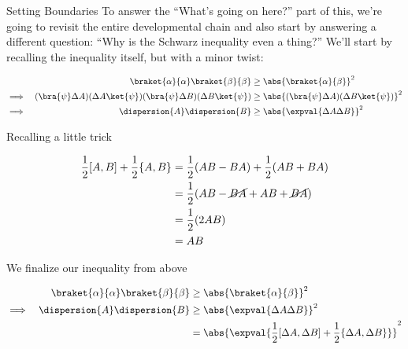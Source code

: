 \begin{answer}
\begin{answerpart}{Setting Boundaries}
    To answer the ``What's going on here?'' part of this, we're going
    to revisit the entire developmental chain and also start by
    answering a different question: ``Why is the Schwarz inequality
    even a thing?''  We'll start by recalling the inequality itself,
    but with a minor twist:

    \begin{equation}
      \begin{alignedat}{2}
        & &
        \braket{\alpha}{\alpha}\braket{\beta}{\beta}
        &\ge \abs{\braket{\alpha}{\beta}}^2\\
        \implies \quad & &
        (\bra{\psi}\Delta A)(\Delta A\ket{\psi})
        (\bra{\psi}\Delta B)(\Delta B\ket{\psi})
        &\ge
        \abs{(\bra{\psi}\Delta A)(\Delta B\ket{\psi})}^2\\
        \implies \quad & &
        \dispersion{A}
        \dispersion{B}
        &\ge
        \abs{\expval{\Delta A \Delta B}}^2
      \end{alignedat}
    \end{equation}

    Recalling a little trick

    \begin{equation}
      \begin{split}
        \frac{1}{2}[A, B] + \frac{1}{2}\{A, B\}
        &= \frac{1}{2}(AB - BA) + \frac{1}{2}(AB + BA)\\
        &= \frac{1}{2}(AB - \cancel{BA} + AB + \cancel{BA})\\
        &= \frac{1}{2}(2 AB)\\
        &= AB\\
      \end{split}
    \end{equation}

    We finalize our inequality from above

    \begin{equation}
      \begin{alignedat}{2}
        & &
        \braket{\alpha}{\alpha}\braket{\beta}{\beta}
        &\ge \abs{\braket{\alpha}{\beta}}^2\\
        \implies \quad & &
        \dispersion{A}
        \dispersion{B}
        &\ge
        \abs{\expval{\Delta A \Delta B}}^2\\
        & &
        &=
        \abs{\expval{\frac{1}{2}[\Delta A, \Delta B]
            + \frac{1}{2}\{\Delta A, \Delta B\}}}^2\\
      \end{alignedat}
    \end{equation}


\end{answerpart}
\end{answer}
